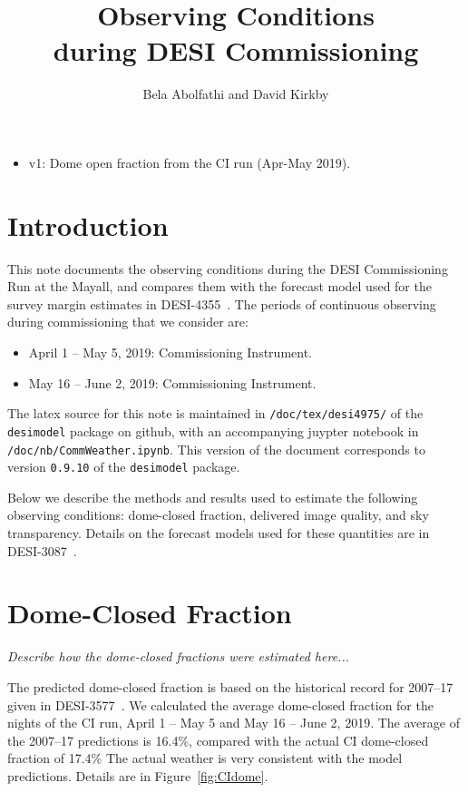 \documentclass[12pt]{article}
\title{Observing Conditions\\
during DESI Commissioning\\
\vspace{5mm}{\large\bf DESI-doc-4975-v1}}
\author{Bela Abolfathi and David Kirkby}
\providecommand{\fig}[1]{Figure~\ref{fig:#1}}
\begin{document}
\maketitle

\begin{itemize}
    \item v1: Dome open fraction from the CI run (Apr-May 2019).
\end{itemize}

\section{Introduction}

This note documents the observing conditions during the DESI Commissioning Run at the Mayall, and compares them
with the forecast model used for the survey margin estimates in DESI-4355~\cite{desi-4355}.
The periods of continuous observing during commissioning that we consider are:
\begin{itemize}
\item April 1 -- May 5, 2019: Commissioning Instrument.
\item May 16 -- June 2, 2019: Commissioning Instrument.
\end{itemize}

The latex source for this note is maintained in {\tt /doc/tex/desi4975/} of the {\tt desimodel} package on github,
with an accompanying juypter notebook in {\tt /doc/nb/CommWeather.ipynb}. This version of the document corresponds to
version {\tt 0.9.10} of the {\tt desimodel} package.

Below we describe the methods and results used to estimate the following observing conditions: dome-closed fraction,
delivered image quality, and sky transparency.  Details on the forecast models used for these quantities are in
DESI-3087~\cite{desi-3087}.

\section{Dome-Closed Fraction}

{\it Describe how the dome-closed fractions were estimated here...}

The predicted dome-closed fraction is based on the historical record for 2007--17 given in DESI-3577~\cite{desi-3577}.
We calculated the average dome-closed fraction for the nights of the CI run, April 1 -- May 5 and May 16 -- June 2, 2019.
The average of the 2007--17 predictions is 16.4\%, compared with the actual CI dome-closed fraction of 17.4\%%
The actual weather is very consistent with the model predictions. Details are in \fig{CIdome}.
\end{document}
